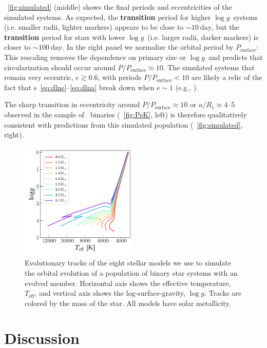 \documentclass[modern, letterpaper]{aastex62}
\newcommand{\apogee}{\project{\acronym{APOGEE}}}
\newcommand{\logg}{\ensuremath{\log g}}
\newcommand{\Psurf}{\ensuremath{P_\textrm{surface}}}
\renewcommand{\changes}[1]{\textbf{#1}}
\begin{document}
\figurename~\ref{fig:simulated} (middle) shows the final periods and
eccentricities of the simulated systems.
As expected, the \changes{transition} period for higher \logg\ systems (i.e.
smaller radii, lighter markers) appears to be close to $\sim 10~\textrm{day}$,
but the \changes{transition} period for stars with lower \logg\ (i.e. larger
radii, darker markers) is closer to $\sim 100~\textrm{day}$.
In the right panel we normalize the orbital period by \Psurf:
This rescaling removes the dependence on primary size or \logg\ and predicts
that circularization should occur around $P / \Psurf \approx 10$.
The simulated systems that remain very eccentric, $e \gtrsim 0.6$, with periods
$P / \Psurf < 10$ are likely a relic of the fact that \eqname
s~\ref{eq:dlne}--\ref{eq:dlna} break down when $e \sim 1$ (e.g.,
\citealt{Hut:1981}).

The sharp transition in eccentricity around $P/\Psurf \approx 10$ or $a/R_1
\approx 4$--5 observed in the sample of \apogee\ binaries
(\figurename~\ref{fig:PeK}, left) is therefore qualitatively consistent with
predictions from this simulated population (\figurename~\ref{fig:simulated},
right).

\begin{figure}[h]
\begin{center}
\includegraphics[width=0.5\textwidth]{mesa}
\end{center}
\caption{%
Evolutionary tracks of the eight stellar models we use to simulate the orbital
evolution of a population of binary star systems with an evolved member.
Horizontal axis shows the effective temperature, $T_\textrm{eff}$, and vertical
axis shows the log-surface-gravity, \logg.
Tracks are colored by the mass of the star.
All models have solar metallicity.
\label{fig:mesa}
}
\end{figure}

\section{Discussion} \label{sec:discussion}
\end{document}
